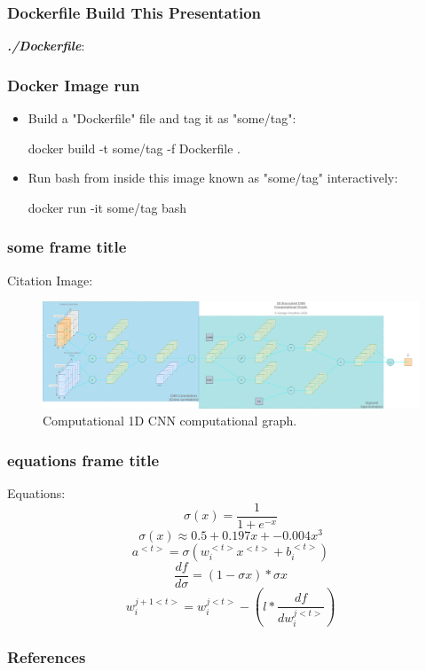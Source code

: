 \documentclass{beamer}
\begin{document}
  \begin{frame}
    \frametitle{Dockerfile Build This Presentation}
    \textbf{\textit{./Dockerfile}}:
  \end{frame}

  \begin{frame}[fragile]%
    \frametitle{Docker Image run}
    \begin{itemize}
        \item Build a "Dockerfile" file and  tag it as "some/tag":
        \begin{bashcode}
docker build -t some/tag -f Dockerfile .
        \end{bashcode}
        \item Run bash from inside this image known as "some/tag" interactively:
        \begin{bashcode}
docker run -it some/tag bash
        \end{bashcode}
    \end{itemize}
  \end{frame}

  \begin{frame}
    \frametitle{some frame title}
    Citation \autocite{gentry2009fully, Goodfellow-et-al-2016}
    Image:
    \begin{figure}[th!]
      \centering
      \includegraphics[width=\textwidth]{encrypted_cnn.png}
      \caption{Computational 1D CNN computational graph.}
      \label{fig:gan}
    \end{figure}
  \end{frame}

  \begin{frame}
    \frametitle{equations frame title}
    Equations:
    \begin{equation}
      \label{sigmoid}
      \sigma(x) = \frac{1}{1+e^{-x}}
    \end{equation}
    \begin{equation}
      \label{sigmoid_approx}
      \sigma(x) \approx 0.5 + 0.197x + -0.004x^3
    \end{equation}
    \begin{equation}
      \label{cnn_activation}
      a^{<t>}=\sigma(w_{i}^{<t>}x^{<t>}+b_i^{<t>})
    \end{equation}
    \begin{equation}
      \label{gradient}
      \frac{df}{d\sigma} = (1-\sigma{x}) * \sigma{x}
    \end{equation}
    \begin{equation}
      \label{weight_update}
      w_i^{j+1<t>} = w_i^{j<t>} - (l * \frac{df}{dw_i^{j<t>}})
    \end{equation}
  \end{frame}

  \begin{frame}[allowframebreaks]
    \frametitle{References}
    \printbibliography
  \end{frame}
\end{document}
